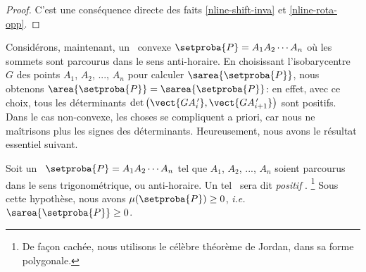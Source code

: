 \begin{proof}
    C'est une conséquence directe des faits \ref{nline-shift-inva} et \ref{nline-rota-opp}.
\end{proof}




Considérons, maintenant, un \ngone\ convexe $\setproba{P} = A_1 A_2 \cdots A_n$ où les sommets sont parcourus dans le sens anti-horaire.
En choisissant l'isobarycentre $G$ des points $A_1$, $A_2$, ..., $A_n$ pour calculer $\sarea{\setproba{P}}$, nous obtenons $\area{\setproba{P}} = \sarea{\setproba{P}}$:
en effet,
avec ce choix, tous les déterminants $\det \big( \vect{G A^{\,\prime}_i} , \vect{G A^{\,\prime}_{i+1}} \big)$ sont positifs.
Dans le cas non-convexe, les choses se compliquent a priori, car nous ne maîtrisons plus les signes des déterminants. Heureusement, nous avons le résultat essentiel suivant.


\begin{fact} \label{route-direction}
    Soit un \ngone\ $\setproba{P} = A_1 A_2 \cdots A_n$ tel que $A_1$, $A_2$, ..., $A_n$ soient parcourus dans le sens trigonométrique, ou anti-horaire.
    Un tel \ngone\ sera dit \og \emph{positif} \fg.%
    \footnote{
    	De façon cachée, nous utilisons le célèbre théorème de Jordan, dans sa forme polygonale.
    }
    Sous cette hypothèse, nous avons 
    $\mu(\setproba{P}) \geq 0$,
    \emph{i.e.}
    $\sarea{\setproba{P}} \geq 0$.
\end{fact}


